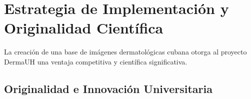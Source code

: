



\section{Estrategia de Implementación y Originalidad Científica}\label{sec:estrategia}

La creación de una base de imágenes dermatológicas cubana otorga al proyecto DermaUH una ventaja competitiva 
y científica significativa.


\subsection{Originalidad e Innovación Universitaria}\label{sec:originalidad}

